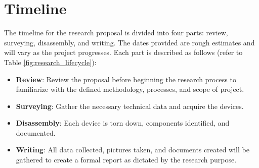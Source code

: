 \chapter{\leavevmode Timeline}
\label{chap:timeline}

The timeline for the research proposal is divided into four parts: review, surveying, disassembly, and writing. The dates provided are rough estimates and will vary as the project progresses. Each part is described as follows (refer to Table \ref{fig:research_lifecycle}):

\begin{itemize}
  \item \textbf{Review}: Review the proposal before beginning the research process to familiarize with the defined methodology, processes, and scope of project.
  \item \textbf{Surveying}: Gather the necessary technical data and acquire the devices.
  \item \textbf{Disassembly}: Each device is torn down, components identified, and documented.
  \item \textbf{Writing}: All data collected, pictures taken, and documents created will be gathered to create a formal report as dictated by the research purpose.
\end{itemize}

